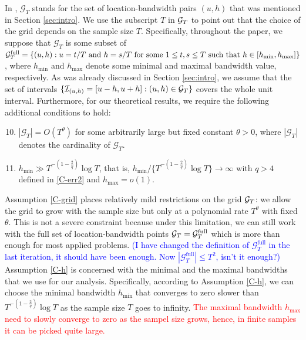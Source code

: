 \documentclass[a4paper,12pt]{article}
\makeatletter
\renewcommand{\eqref}[1]{\tagform@{\ref{#1}}}
\makeatother
\begin{document}
In \eqref{eq:Psi_hat}, $\mathcal{G}_T$ stands for the set of location-bandwidth pairs $(u, h)$ that was mentioned in Section \ref{sec:intro}. We use the subscript $T$ in $\mathcal{G}_T$ to point out that the choice of the grid depends on the sample size $T$. Specifically, throughout the paper, we suppose that $\mathcal{G}_T$ is some subset of $\mathcal{G}_T^{\text{full}} = \{ (u,h): u = t/T \text{ and } h = s/T \text{ for some } 1 \le t, s \le T \text{ such that } \linebreak h \in [h_{\min},h_{\max}] \}$, where $h_{\min}$ and $h_{\max}$ denote some minimal and maximal bandwidth value, respectively. As was already discussed in Section \ref{sec:intro}, we assume that the set of intervals $\{\mathcal{I}_{(u, h)} = [u-h, u+h]: (u, h) \in \mathcal{G}_T\}$ covers the whole unit interval. Furthermore, for our theoretical results, we require the following additional conditions to hold:
\begin{enumerate}[label=(C\arabic*),leftmargin=1.05cm]
\setcounter{enumi}{9}

\item \label{C-grid} $|\mathcal{G}_T| = O(T^\theta)$ for some arbitrarily large but fixed constant $\theta > 0$, where $|\mathcal{G}_T|$ denotes the cardinality of $\mathcal{G}_T$. 

\item \label{C-h} $h_{\min} \gg T^{-(1-\frac{2}{q})} \log T$, that is, $h_{\min} / \{ T^{-(1-\frac{2}{q})} \log T \} \rightarrow \infty$ with $q > 4$ defined in \ref{C-err2} and $h_{\max} = o(1)$.

\end{enumerate}
Assumption \ref{C-grid} places relatively mild restrictions on the grid $\mathcal{G}_T$: we allow the grid to grow with the sample size but only at a polynomial rate $T^\theta$ with fixed $\theta$. This is not a severe constraint because under this limitation, we can still work with the full set of location-bandwidth points $\mathcal{G}_T = \mathcal{G}_T^{\text{full}}$ which is more than enough for most applied problems. \textcolor{blue}{(I have changed the definition of $\mathcal{G}_T^{\text{full}}$ in the last iteration, it should have been enough. Now $|\mathcal{G}_T^{\text{full}}| \leq T^2$, isn't it enough?)} Assumption \ref{C-h} is concerned with the minimal and the maximal bandwidths that we use for our analysis. Specifically, according to Assumption \ref{C-h}, we can choose the minimal bandwidth $h_{\min}$ that converges to zero slower than $T^{-(1-\frac{2}{q})} \log T$ as the sample size $T$ goes to infinity. \textcolor{red}{The maximal bandwidth $h_{\max}$ need to slowly converge to zero as the sampel size grows, hence, in finite samples it can be picked quite large.}
\end{document}
